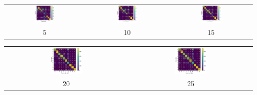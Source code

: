 \documentclass[12pt]{article}
\begin{document}
\begin{enumerate}[label=(\alph*)]
    \begin{center}
        \begin{tabular}{c c c}
            \includegraphics[width=0.27\textwidth]{../Q2/single_layer_sigmoid_epochlr/cmat_5.pdf} &
            \includegraphics[width=0.27\textwidth]{../Q2/single_layer_sigmoid_epochlr/cmat_10.pdf} &
            \includegraphics[width=0.27\textwidth]{../Q2/single_layer_sigmoid_epochlr/cmat_15.pdf} \\
            5 & 10 & 15 
        \end{tabular}

        \begin{tabular}{c c}
            \includegraphics[width=0.27\textwidth]{../Q2/single_layer_sigmoid_epochlr/cmat_20.pdf} &
            \includegraphics[width=0.27\textwidth]{../Q2/single_layer_sigmoid_epochlr/cmat_25.pdf} \\
            20 & 25
        \end{tabular}
    \end{center}


\end{enumerate}
\end{document}
